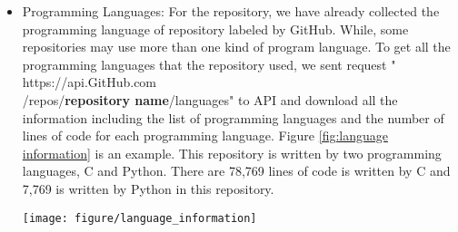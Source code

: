 \documentclass[12pt,oneside,final]{vlsithesis}
\begin{document}
\begin{itemize}
	\item Programming Languages: For the repository, we have already collected the programming language of repository labeled by GitHub. While, some repositories may use more than one kind of program language. To get all the programming languages that the repository used, we sent request " https://api.GitHub.com\\/repos/\textbf{repository name}/languages" to API and download all the information including the list of programming languages and the number of lines of code for each programming language. Figure \ref{fig:language information} is an example. This repository is written by two programming languages, C and Python. There are 78,769 lines of code is written by C and 7,769 is written by Python in this repository.
	\begin{figure*}
		\centering
		\texttt{[image: figure/language\_information]}
		\caption{Example of language information}
		\label{fig:language information}
	\end{figure*}
\end{itemize}
\end{document}
